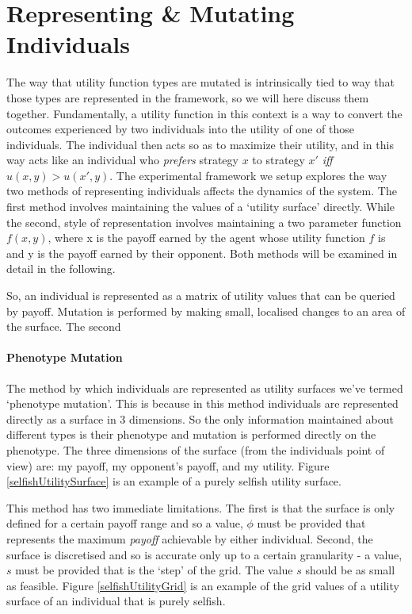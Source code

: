 \documentclass[11pt]{book}
\newcommand*{\np}{\par\noindent\newline}
\begin{document}
\section{Representing \& Mutating Individuals}
\np The way that utility function types are mutated is intrinsically tied to way that those types are represented in the framework, so we will here discuss them together.
Fundamentally, a utility function in this context is a way to convert the outcomes experienced by two individuals into the utility of one of those individuals.
The individual then acts so as to maximize their utility, and in this way acts like an individual who \textit{prefers} strategy $x$ to strategy $x'$ \textit{iff} $u(x, y) > u(x', y)$.
The experimental framework we setup explores the way two methods of representing individuals affects the dynamics of the system.
The first method involves maintaining the values of a `utility surface' directly. 
While the second, style of representation involves maintaining a two parameter function $f(x,y)$, where x is the payoff earned by the agent whose utility function $f$ is and y is the payoff earned by their opponent. 
Both methods will be examined in detail in the following.


So, an individual is represented as a matrix of utility values that can be queried by payoff.
Mutation is performed by making small, localised changes to an area of the surface.
The second 


\paragraph{Phenotype Mutation}
\np The method by which individuals are represented as utility surfaces we've termed `phenotype mutation'.
This is because in this method individuals are represented directly as a surface in 3 dimensions.
So the only information maintained about different types is their phenotype and mutation is performed directly on the phenotype.
The three dimensions of the surface (from the individuals point of view) are: my payoff, my opponent's payoff, and my utility.
Figure \ref{selfishUtilitySurface} is an example of a purely selfish utility surface.

\np This method has two immediate limitations. 
The first is that the surface is only defined for a certain payoff range and so a value, $\phi$ must be provided that represents the maximum \textit{payoff} achievable by either individual.
Second, the surface is discretised and so is accurate only up to a certain granularity - a value, $s$ must be provided that is the `step' of the grid.
The value $s$ should be as small as feasible. 
Figure \ref{selfishUtilityGrid} is an example of the grid values of a utility surface of an individual that is purely selfish.
\end{document}

